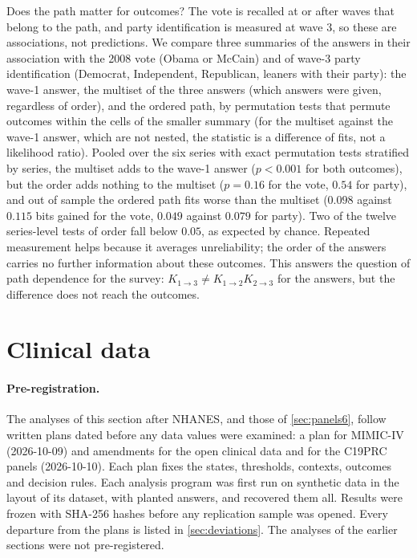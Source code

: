 \documentclass[11pt]{article}
\theoremstyle{definition}
\theoremstyle{remark}
\begin{document}
Does the path matter for outcomes? The vote is recalled at or after waves that belong to the path, and party identification is measured
at wave 3, so these are associations, not predictions. We compare three summaries of the answers in their association with the 2008 vote (Obama or McCain) and of wave-3 party identification
(Democrat, Independent, Republican, leaners with their party): the wave-1 answer, the multiset of the three answers (which answers were
given, regardless of order), and the ordered path, by permutation tests that permute outcomes within the cells of the smaller summary
(for the multiset against the wave-1 answer, which are not nested, the statistic is a difference of fits, not a likelihood ratio). Pooled over the six series with exact permutation tests stratified by series, the
multiset adds to the wave-1 answer ($p<0.001$ for both outcomes), but the order adds nothing to the multiset ($p=0.16$ for the vote,
$0.54$ for party), and out of sample the ordered path fits worse than the multiset ($0.098$ against $0.115$ bits gained for the vote,
$0.049$ against $0.079$ for party). Two of the twelve series-level tests of order fall below $0.05$, as expected by chance. Repeated
measurement helps because it averages unreliability; the order of the answers carries no further information about these outcomes. This
answers the question of path dependence for the survey: $K_{1\to3}\ne K_{1\to2}K_{2\to3}$ for the answers, but the difference does not
reach the outcomes.

\section{Clinical data}\label{sec:clinical}

\paragraph{Pre-registration.} The analyses of this section after NHANES, and those of \cref{sec:panels6}, follow written plans dated
before any data values were examined: a plan for MIMIC-IV (2026-10-09) and amendments for the open clinical data and for the C19PRC panels
(2026-10-10). Each plan fixes the states, thresholds, contexts, outcomes and decision rules. Each analysis program was first run on
synthetic data in the layout of its dataset, with planted answers, and recovered them all. Results were frozen with SHA-256 hashes before any
replication sample was opened. Every departure from the plans is listed in \cref{sec:deviations}. The analyses of the earlier sections
were not pre-registered.
\end{document}
